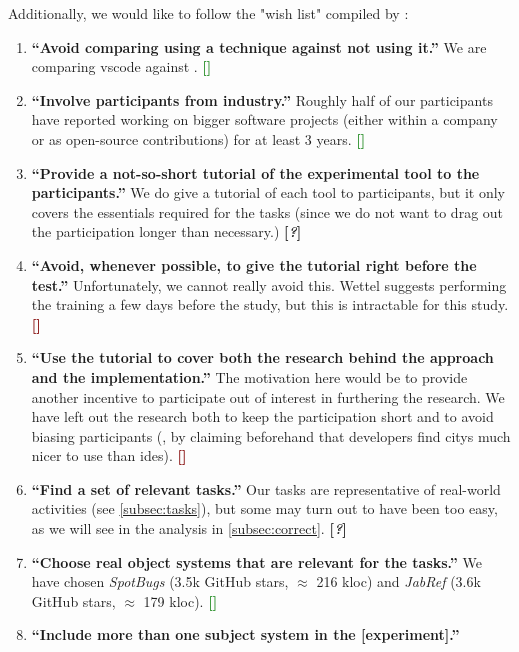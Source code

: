 \documentclass[../thesis]{subfiles}
\begin{document}
Additionally, we would like to follow the "wish list" compiled by \textcite[122--124]{wettel2011}:
\newcommand{\cyes}{\textcolor{ForestGreen}{\textbf{[\ding{51}]}}}
\newcommand{\chmm}{\textcolor{BurntOrange}{\textbf{[\textit{?}]}}}
\newcommand{\cno}{\textcolor{Maroon}{\textbf{[\ding{55}]}}}
\begin{enumerate}
	\item \textbf{\enquote{Avoid comparing using a technique against not using it.}}
	      We are comparing \gls{vscode} against \SEE{}. \cyes
	\item \textbf{\enquote{Involve participants from industry.}}
	      Roughly half of our participants have reported working on bigger software projects (either within a company or as open-source contributions) for at least 3 years. \cyes
	\item \textbf{\enquote{Provide a not-so-short tutorial of the experimental tool to the participants.}}
	      We do give a tutorial of each tool to participants, but it only covers the essentials required for the tasks (since we do not want to drag out the participation longer than necessary.) \chmm
	\item \textbf{\enquote{Avoid, whenever possible, to give the tutorial right before the test.}}
	      Unfortunately, we cannot really avoid this.
	      Wettel suggests performing the training a few days before the study, but this is intractable for this study. \cno
	\item \textbf{\enquote{Use the tutorial to cover both the research behind the approach and the implementation.}}
	      The motivation here would be to provide another incentive to participate out of interest in furthering the research.
	      We have left out the research both to keep the participation short and to avoid biasing participants (\eg, by claiming beforehand that developers find \glspl{city} much nicer to use than \glspl{ide}). \cno
	\item \textbf{\enquote{Find a set of relevant tasks.}}
	      Our tasks are representative of real-world activities (see \cref{subsec:tasks}), but some may turn out to have been too easy, as we will see in the analysis in \cref{subsec:correct}. \chmm
	\item \textbf{\enquote{Choose real object systems that are relevant for the tasks.}}
	      We have chosen \emph{SpotBugs} (3.5k GitHub stars, $\approx$ 216 k\gls{loc}) and \emph{JabRef} (3.6k GitHub stars, $\approx$ 179 k\gls{loc}). \cyes
	\item \textbf{\enquote{Include more than one subject system in the [experiment].}}

\end{enumerate}
\end{document}

